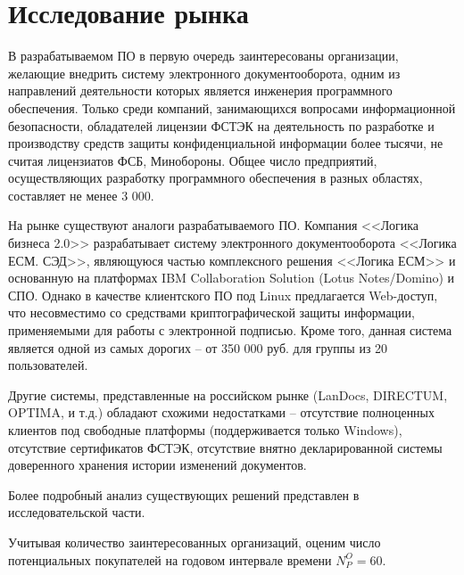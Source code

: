 \section{Исследование рынка} \label{economics_market_research}

В разрабатываемом ПО в первую очередь заинтересованы организации, желающие внедрить систему электронного документооборота, одним из направлений деятельности которых является инженерия программного обеспечения.
Только среди компаний, занимающихся вопросами информационной безопасности, обладателей лицензии ФСТЭК на деятельность по разработке и производству средств защиты конфиденциальной информации более тысячи, не считая лицензиатов ФСБ, Минобороны.
Общее число предприятий, осуществляющих разработку программного обеспечения в разных областях, составляет не менее 3 000.

\vspace{\baselineskip}
На рынке существуют аналоги разрабатываемого ПО. Компания <<Логика бизнеса 2.0>> разрабатывает систему электронного документооборота <<Логика ЕСМ. СЭД>>, являющуюся частью комплексного решения <<Логика ЕСМ>> и основанную на платформах IBM Collaboration Solution (Lotus Notes/Domino) и СПО. Однако в качестве клиентского ПО под Linux предлагается Web-доступ, что несовместимо со средствами криптографической защиты информации, применяемыми для работы с электронной подписью. Кроме того, данная система является одной из самых дорогих -- от 350 000 руб. для группы из 20 пользователей.

Другие системы, представленные на российском рынке (LanDocs, DIRECTUM, OPTIMA, и т.д.) обладают схожими недостатками -- отсутствие полноценных клиентов под свободные платформы (поддерживается только Windows), отсутствие сертификатов ФСТЭК, отсутствие внятно декларированной системы доверенного хранения истории изменений документов.

Более подробный анализ существующих решений представлен в исследовательской части.

\vspace{\baselineskip}
Учитывая количество заинтересованных организаций, оценим число потенциальных покупателей на годовом интервале времени $N_P^O = 60$.

